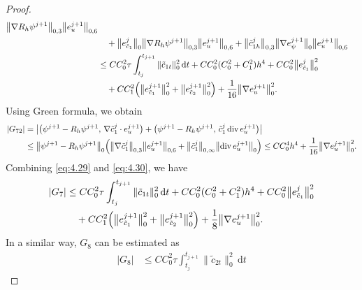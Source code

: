 \documentclass[a4paper,fleqn]{cas-sc}
\numberwithin{equation}{section}
\theoremstyle{definition}
\begin{document}
\begin{proof}
\begin{align}
         \bigl\|\nabla R_{h}\psi^{j+1}\bigr\|_{0,3}\bigl\|e_{u}^{j+1}\bigr\|_{0,6}
  \nonumber\\
  &\quad + \bigl\|e_{\tilde{c}_{1}}^{j}\bigr\|_{0}
           \bigl\|\nabla R_{h}\psi^{j+1}\bigr\|_{0,3}\bigl\|e_{u}^{j+1}\bigr\|_{0,6}
         + \bigl\|\tilde{c}_{1h}^{j}\bigr\|_{0,3}
           \bigl\|\nabla e_{\psi}^{j+1}\bigr\|_{0}\bigl\|e_{u}^{j+1}\bigr\|_{0,6}
  \nonumber\\
  &\leq CC_{0}^{2}\tau\int_{t_{j}}^{t_{j+1}}\|\tilde{c}_{1t}\|_{0}^{2}\,\mathrm{d}t
    + CC_{0}^{2}(C_{0}^{2}+C_{1}^{2})h^{4}
    + CC_{0}^{2}\bigl\|e_{\tilde{c}_{1}}^{j}\bigr\|_{0}^{2}
  \nonumber\\
  &\quad + CC_{1}^{2}\Bigl(\bigl\|e_{\tilde{c}_{1}}^{j+1}\bigr\|_{0}^{2}
                           + \bigl\|e_{\tilde{c}_{2}}^{j+1}\bigr\|_{0}^{2}\Bigr)
         + \frac{1}{16}\bigl\|\nabla e_{u}^{j+1}\bigr\|_{0}^{2}.
  \label{eq:4.29}
\end{align}
Using Green formula, we obtain
\begin{align}
  |G_{72}|
  &= \bigl|\bigl(\psi^{j+1} - R_{h}\psi^{j+1},\,
                 \nabla\tilde{c}_{1}^{j}\cdot e_{u}^{j+1}\bigr)
          + \bigl(\psi^{j+1} - R_{h}\psi^{j+1},\,
                 \tilde{c}_{1}^{j}\operatorname{div}e_{u}^{j+1}\bigr)\bigr|
  \nonumber\\
  &\leq \bigl\|\psi^{j+1} - R_{h}\psi^{j+1}\bigr\|_{0}
    \Bigl(\bigl\|\nabla\tilde{c}_{1}^{j}\bigr\|_{0,3}\bigl\|e_{u}^{j+1}\bigr\|_{0,6}
         + \bigl\|\tilde{c}_{1}^{j}\bigr\|_{0,\infty}\bigl\|\operatorname{div}e_{u}^{j+1}\bigr\|_{0}\Bigr)
  \leq CC_{0}^{4}h^{4} + \frac{1}{16}\bigl\|\nabla e_{u}^{j+1}\bigr\|_{0}^{2}.
  \label{eq:4.30}
\end{align}
Combining \eqref{eq:4.29} and \eqref{eq:4.30}, we have
\begin{align}
  |G_{7}|
  &\leq CC_{0}^{2}\tau\int_{t_{j}}^{t_{j+1}}\|\tilde{c}_{1t}\|_{0}^{2}\,\mathrm{d}t
    + CC_{0}^{2}(C_{0}^{2}+C_{1}^{2})h^{4}
    + CC_{0}^{2}\bigl\|e_{\tilde{c}_{1}}^{j}\bigr\|_{0}^{2}
  \nonumber\\
  &\quad + CC_{1}^{2}\Bigl(\bigl\|e_{\tilde{c}_{1}}^{j+1}\bigr\|_{0}^{2}
                           + \bigl\|e_{\tilde{c}_{2}}^{j+1}\bigr\|_{0}^{2}\Bigr)
         + \frac{1}{8}\bigl\|\nabla e_{u}^{j+1}\bigr\|_{0}^{2}.
  \label{eq:4.31}
\end{align}
In a similar way, $G_{8}$ can be estimated as
\begin{align}
  |G_{8}|
  &\leq CC_{0}^{2}\tau\int_{t_{j}}^{t_{j+1}}\|\tilde{c}_{2t}\|_{0}^{2}\,\mathrm{d}t

\end{align}
\end{proof}
\end{document}
